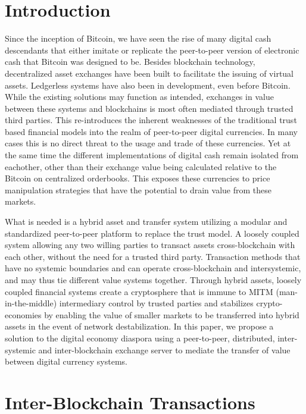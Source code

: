 \documentclass[11pt, a4paper]{article}
\begin{document}
\newpage


\section{Introduction}

Since the inception of Bitcoin, we have seen the rise of many digital cash descendants that either imitate or replicate the peer-to-peer version of electronic cash that Bitcoin was designed to be. Besides blockchain technology, decentralized asset exchanges\cite{counterparty} have been built to facilitate the issuing of virtual assets. Ledgerless\cite{opentransactions} systems have also been in development, even before Bitcoin. While the existing solutions may function as intended, exchanges in value between these systems and blockchains is most often mediated through trusted third parties. This re-introduces the inherent weaknesses of the traditional trust based financial models into the realm of peer-to-peer digital currencies. In many cases this is no direct threat to the usage and trade of these currencies. Yet at the same time the different implementations of digital cash remain isolated from eachother, other than their exchange value being calculated relative to the Bitcoin on centralized orderbooks. This exposes these currencies to price manipulation strategies that have the potential to drain value from these markets\cite{panture}.

What is needed is a hybrid asset and transfer system utilizing a modular and standardized peer-to-peer platform to replace the trust model. A loosely coupled system\cite{EDA} allowing any two willing parties to transact assets cross-blockchain with each other, without the need for a trusted third party. Transaction methods that have no systemic boundaries and can operate cross-blockchain and intersystemic, and may thus tie different value systems together. Through hybrid assets, loosely coupled financial systems create a cryptosphere that is immune to MITM (man-in-the-middle) intermediary control by trusted parties and stabilizes crypto-economies by enabling the value of smaller markets to be transferred into hybrid assets in the event of network destabilization. In this paper, we propose a solution to the digital economy diaspora using a peer-to-peer, distributed, inter-systemic and inter-blockchain exchange server to mediate the transfer of value between digital currency systems.


\section{Inter-Blockchain Transactions}
\end{document}
